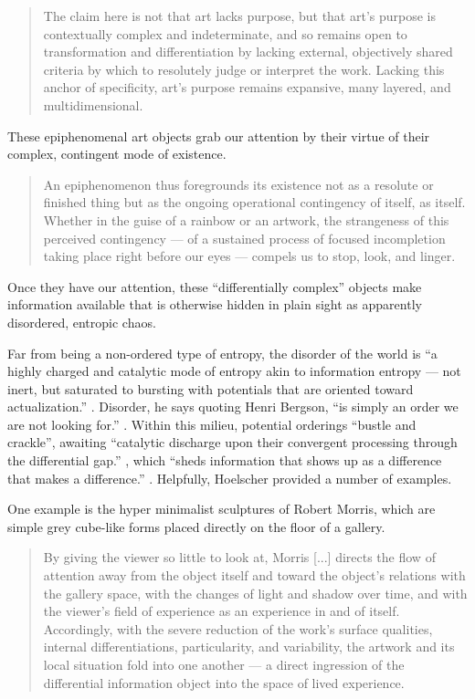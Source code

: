 \documentclass[letterpaper]{article}
\begin{document}
    \begin{quote}
        The claim here is not that art lacks purpose, but that art's purpose is contextually complex and indeterminate, and so remains open to transformation and differentiation by lacking external, objectively shared criteria by which to resolutely judge or interpret the work. Lacking this anchor of specificity, art's purpose remains expansive, many layered, and multidimensional.\citep[p.25]{HoelscherThPtcsOfPhsSpc2014}
    \end{quote}

    These epiphenomenal art objects grab our attention by their virtue of their complex, contingent mode of existence.

    \begin{quote}
        An epiphenomenon thus foregrounds its existence not as a resolute or finished thing but as the ongoing operational contingency of itself, as itself. Whether in the guise of a rainbow or an artwork, the strangeness of this perceived contingency — of a sustained process of focused incompletion taking place right before our eyes — compels us to stop, look, and linger.
    \end{quote}

    Once they have our attention, these “differentially complex” \citep[p.74]{HoelscherArtAsInfrmtn2021} objects make information available that is otherwise hidden in plain sight as apparently disordered, entropic chaos.
    
    Far from being a non-ordered type of entropy, the disorder of the world is “a highly charged and catalytic mode of entropy akin to information entropy — not inert, but saturated to bursting with potentials that are oriented toward actualization.” \citep[p.72]{HoelscherArtAsInfrmtn2021}. Disorder, he says quoting Henri Bergson, “is simply an order we are not looking for.” \citep[p.73]{HoelscherArtAsInfrmtn2021}. Within this milieu, potential orderings “bustle and crackle”, awaiting “catalytic discharge upon their convergent processing through the differential gap.” \citep[p.73]{HoelscherArtAsInfrmtn2021}, which “sheds information that shows up as a difference that makes a difference.” \citep[p.75]{HoelscherArtAsInfrmtn2021}. Helpfully, Hoelscher provided a number of examples.

    One example is the hyper minimalist sculptures of Robert Morris, which are simple grey cube-like forms placed directly on the floor of a gallery.

    \begin{quote}
        By giving the viewer so little to look at, Morris [...] directs the flow of attention away from the object itself and toward the object's relations with the gallery space, with the changes of light and shadow over time, and with the viewer's field of experience as an experience in and of itself. Accordingly, with the severe reduction of the work's surface qualities, internal differentiations, particularity, and variability, the artwork and its local situation fold into one another — a direct ingression of the differential information object into the space of lived experience. \citep[p.78]{HoelscherArtAsInfrmtn2021}
    \end{quote}
\end{document}
